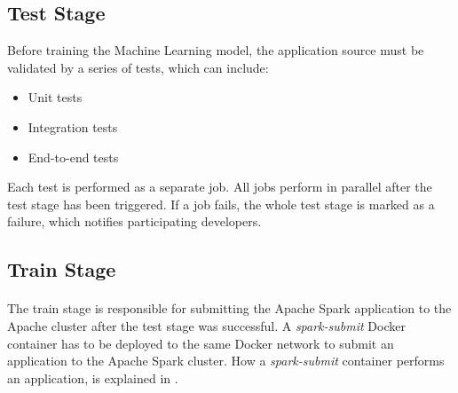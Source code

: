 \subsection{Test Stage}
Before training the Machine Learning model, the application source must be validated by a series of tests, which can include:
\begin{itemize}
\item Unit tests
\item Integration tests
\item End-to-end tests
\end{itemize}
Each test is performed as a separate job. All jobs perform in parallel after the test stage has been triggered.
If a job fails, the whole test stage is marked as a failure, which notifies participating developers.


\subsection{Train Stage}
\paragraph{}
The train stage is responsible for submitting the Apache Spark application to the Apache cluster after the test stage was successful.
A \textit{spark-submit} Docker container has to be deployed to the same Docker network to submit an application to the Apache Spark cluster. How a \textit{spark-submit} container performs an application, is explained in .

